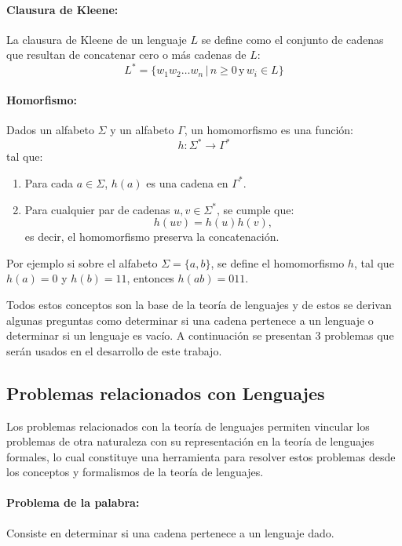 \paragraph{Clausura de Kleene:} La clausura de Kleene de un lenguaje $L$ se define como el conjunto de
cadenas que resultan de concatenar cero o más cadenas de $L$:
$$L^*=\{w_1w_2\ldots w_n\,|\,n\geq 0\,\text{y}\,w_i\in L\}$$

\paragraph{Homorfismo:} Dados un alfabeto \( \Sigma \) y un alfabeto \( \Gamma \), un homomorfismo es una función:
\[
      h: \Sigma^* \to \Gamma^*
\]
tal que:
\begin{enumerate}
      \item Para cada \( a \in \Sigma \), \( h(a) \) es una cadena en \( \Gamma^* \).
      \item Para cualquier par de cadenas \( u, v \in \Sigma^* \), se cumple que:
            \[
                  h(uv) = h(u) h(v),
            \]
            es decir, el homomorfismo preserva la concatenación.
\end{enumerate}

Por ejemplo si sobre el alfabeto $\Sigma=\{a,b\}$, se define el homomorfismo $h$, tal que $h(a)=0$ y $h(b)=11$, entonces
$h(ab)=011$.

Todos estos conceptos son la base de la teoría de lenguajes y de estos se derivan algunas 
preguntas como determinar si una cadena pertenece a un lenguaje o determinar si un lenguaje es vacío. A continuación se presentan 3 problemas que serán usados en el desarrollo de este trabajo.

\subsection{Problemas relacionados con Lenguajes}

Los problemas relacionados con la teoría de lenguajes permiten vincular los problemas de otra naturaleza 
con su representación en la teoría de lenguajes formales, lo cual constituye una herramienta para resolver
estos problemas desde los conceptos y formalismos de la teoría de lenguajes.

\paragraph{Problema de la palabra:} Consiste en determinar si una cadena pertenece a un lenguaje dado.

